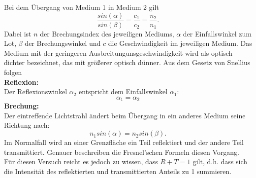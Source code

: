 Bei dem Übergang von Medium 1 in Medium 2 gilt
\begin{equation*}
    \frac{sin(\alpha)}{sin(\beta)} = \frac{c_1}{c_2} = \frac{n_2}{n_1}.
\end{equation*}
Dabei ist $n$ der Brechungsindex des jeweiligen Mediums, $\alpha$ der Einfallswinkel zum Lot, $\beta$ der Brechungswinkel und $c$ die Geschwindigkeit im jeweiligen Medium.
Das Medium mit der geringeren Ausbreitungunsgeschwindigkeit wird als optisch dichter  bezeichnet, das mit größerer optisch dünner. 
Aus dem Gesetz von Snellius folgen\\
\textbf{Reflexion:}\\
Der Reflexionswinkel $\alpha_2$ entspricht dem Einfallswinkel $\alpha_1$:
\begin{equation*}
    \alpha_1 = \alpha_2
\end{equation*}
\textbf{Brechung:}\\
Der eintreffende Lichtstrahl ändert beim Übergang in ein anderes Medium seine Richtung nach:
\begin{equation*}
    n_1 sin(\alpha) = n_2 sin(\beta).
\end{equation*}
Im Normalfall wird an einer Grenzfläche ein Teil reflektiert und der andere Teil transmittiert. Genauer beschreiben die Fresnel'schen Formeln diesen Vorgang.
Für diesen Versuch reicht es jedoch zu wissen, dass $R + T = 1$ gilt, d.h. dass sich die Intensität des reflektierten und transmittierten Anteils zu 1 summieren.
